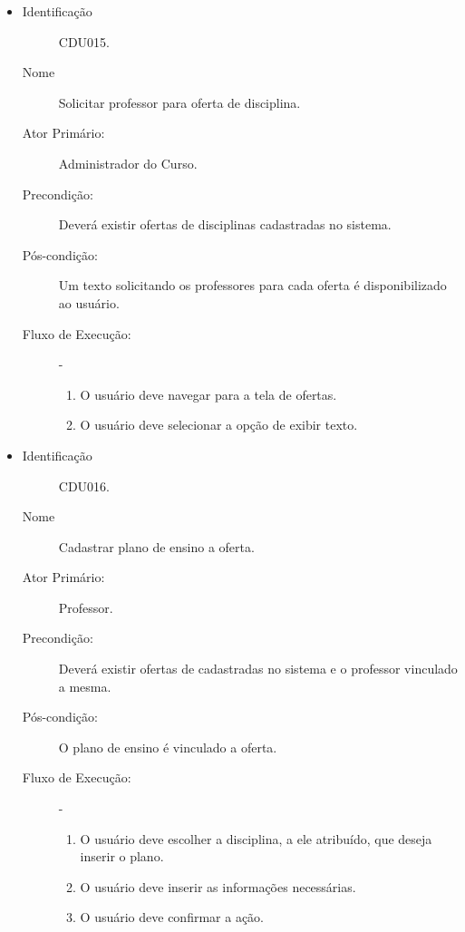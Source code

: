 \begin{itemize}
    \item 
        \begin{description}
           \item[Identificação] CDU015.
           \item[Nome] Solicitar professor para oferta de disciplina.
           \item[Ator Primário:] Administrador do Curso.
           \item[Precondição:] Deverá existir ofertas de disciplinas cadastradas no sistema. 
           \item[Pós-condição:] Um texto solicitando os professores para cada oferta é disponibilizado ao usuário.
           \item[Fluxo de Execução:] -
                \begin{enumerate}
                    \item O usuário deve navegar para a tela de ofertas.
                    \item O usuário deve selecionar a opção de exibir texto.
                \end{enumerate}
        \end{description} 
    \vspace{10pt}

    \item 
        \begin{description}
           \item[Identificação] CDU016.
           \item[Nome] Cadastrar plano de ensino a oferta.
           \item[Ator Primário:] Professor.
           \item[Precondição:] Deverá existir ofertas de cadastradas no sistema e o professor vinculado a mesma. 
           \item[Pós-condição:] O plano de ensino é vinculado a oferta.
           \item[Fluxo de Execução:] -
                \begin{enumerate}
                    \item O usuário deve escolher a disciplina, a ele atribuído, que deseja inserir o plano.
                    \item O usuário deve inserir as informações necessárias.
                    \item O usuário deve confirmar a ação.
                \end{enumerate}
        \end{description} 
    \vspace{10pt}




\end{itemize}



